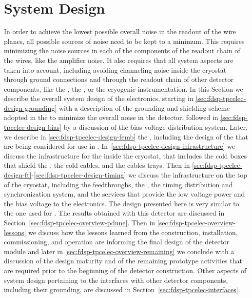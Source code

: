 \section{System Design}
\label{sec:fdsp-tpcelec-design}

In order to achieve the lowest possible overall noise in the readout of 
the  wire planes, all possible sources of noise need to be kept to a
minimum. This requires minimizing the noise sources in each
of the components of the readout chain of the  wires, like
the  amplifier noise. It also requires that all system aspects
are taken into account, including avoiding channeling noise inside
the cryostat through ground connections and through the readout
chain of other detector components, like the , the ,
or the cryogenic instrumentation. In this Section we describe the overall
system design of the  electronics, starting in
\ref{sec:fdsp-tpcelec-design-grounding} with a description of the
grounding and shielding scheme adopted in the  
to minimize the overall noise in the detector, followed in
\ref{sec:fdsp-tpcelec-design-bias} by a discussion of the bias
voltage distribution system. Later, we describe in 
\ref{sec:fdsp-tpcelec-design-femb} the , including
the design of the  that are being considered for
use in . In~\ref{sec:fdsp-tpcelec-design-infrastructure}
we discuss the infrastructure for the  inside the cryostat,
that includes the cold boxes that shield the , the
cold cables, and the cables trays. Then in
\ref{sec:fdsp-tpcelec-design-ft}-\ref{sec:fdsp-tpcelec-design-timing} we discuss 
the infrastructure on the top of the cryostat, including the
feedthroughs, the , the timing distribution and
synchronization system, and the services that provide the low
voltage power and the bias voltage to the  electronics. 
The design presented here is very similar to the one used for
. The results obtained with this detector are 
discussed in Section~\ref{sec:fdsp-tpcelec-overview-pdune}.
Then in \ref{sec:fdsp-tpcelec-overview-lessons} we discuss
how the lessons learned from the construction, installation,
commissioning, and operation are informing the final design
of the   detector module and later in
\ref{sec:fdsp-tpcelec-overview-remaining} we conclude
with a discussion of the design maturity and of
the remaining prototype activities that are required prior to
the beginning of the detector construction. Other aspects of system
design pertaining to the interfaces with other detector components, including
their grounding, are discussed in Section~\ref{sec:fdsp-tpcelec-interfaces}.

